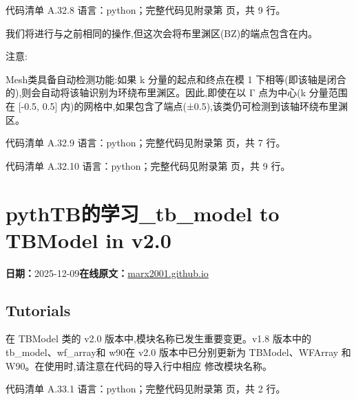 \documentclass[lang=cn,scheme=chinese,color=blue,device=normal,toc=onecol,math=cm]{elegantbook}
\begin{document}
\begin{codeindexbox}{代码清单 A.32.8}
语言：python；完整代码见附录第 \pageref{code:32:8} 页，共 9 行。
\end{codeindexbox}


我们将进行与之前相同的操作,但这次会将布里渊区(BZ)的端点包含在内。\par


注意:\par


Mesh类具备自动检测功能:如果 k 分量的起点和终点在模 1 下相等(即该轴是闭合的),则会自动将该轴识别为环绕布里渊区。因此,即使在以 Γ 点为中心(k 分量范围在 [-0.5, 0.5] 内)的网格中,如果包含了端点(±0.5),该类仍可检测到该轴环绕布里渊区。\par


\begin{codeindexbox}{代码清单 A.32.9}
语言：python；完整代码见附录第 \pageref{code:32:9} 页，共 7 行。
\end{codeindexbox}


\begin{codeindexbox}{代码清单 A.32.10}
语言：python；完整代码见附录第 \pageref{code:32:10} 页，共 9 行。
\end{codeindexbox}



\section{pythTB的学习\_\allowbreak{}tb\_\allowbreak{}model to TBModel in v2.0}
\begin{articlemeta}
\textbf{日期：}2025-12-09\hfill\textbf{在线原文：}\href{https://marx2001.github.io/sci-note\_posts/20251209-PythonTB\_tb}{marx2001.github.io}
\end{articlemeta}

\subsection{Tutorials}


在 TBModel 类的 v2.0 版本中,模块名称已发生重要变更。v1.8 版本中的 tb\_\allowbreak{}model、wf\_\allowbreak{}array和 w90在 v2.0 版本中已分别更新为 TBModel、WFArray 和 W90。在使用时,请注意在代码的导入行中相应 修改模块名称。\par


\begin{codeindexbox}{代码清单 A.33.1}
语言：python；完整代码见附录第 \pageref{code:33:1} 页，共 2 行。
\end{codeindexbox}
\end{document}
